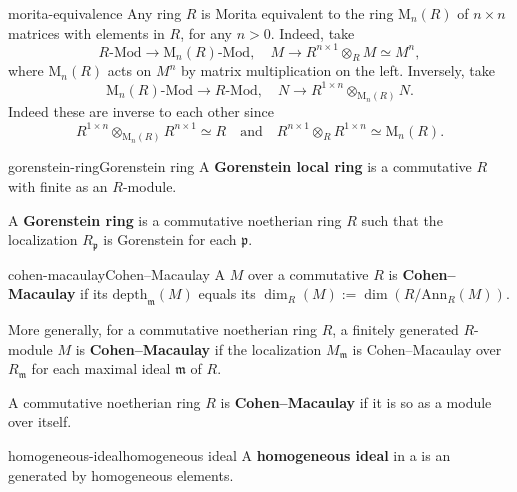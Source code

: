 \begin{example}{morita-equivalence}
    Any ring $R$ is Morita equivalent to the ring $\text{M}_n(R)$ of $n \times n$ matrices with elements in $R$, for any $n > 0$. Indeed, take
    \[ R\text{-Mod} \to \text{M}_n(R)\text{-Mod}, \quad M \to R^{n \times 1} \otimes_R M \simeq M^n , \]
    where $\text{M}_n(R)$ acts on $M^n$ by matrix multiplication on the left. Inversely, take
    \[ \text{M}_n(R)\text{-Mod} \to R\text{-Mod}, \quad N \to R^{1 \times n} \otimes_{\text{M}_n(R)} N . \]
    Indeed these are inverse to each other since
    \[ R^{1 \times n} \otimes_{\text{M}_n(R)} R^{n \times 1} \simeq R \quad \text{and} \quad R^{n \times 1} \otimes_R R^{1 \times n} \simeq \text{M}_n(R) . \]
\end{example}

\begin{topic}{gorenstein-ring}{Gorenstein ring}
    A \textbf{Gorenstein local ring} is a commutative    $R$ with finite  as an $R$-module.
    
    A \textbf{Gorenstein ring} is a commutative noetherian ring $R$ such that the localization $R_\mathfrak{p}$ is Gorenstein for each  $\mathfrak{p}$.
\end{topic}

\begin{topic}{cohen-macaulay}{Cohen--Macaulay}
    A   $M$ over a commutative    $R$ is \textbf{Cohen--Macaulay} if its  $\text{depth}_{\mathfrak{m}}(M)$ equals its  $\dim_R(M) := \dim(R/\text{Ann}_R(M))$.
    
    More generally, for a commutative noetherian ring $R$, a finitely generated $R$-module $M$ is \textbf{Cohen--Macaulay} if the localization $M_\mathfrak{m}$ is Cohen--Macaulay over $R_\mathfrak{m}$ for each maximal ideal $\mathfrak{m}$ of $R$.
    
    A commutative noetherian ring $R$ is \textbf{Cohen--Macaulay} if it is so as a module over itself.
\end{topic}

\begin{topic}{homogeneous-ideal}{homogeneous ideal}
    A \textbf{homogeneous ideal} in a  is an  generated by homogeneous elements.
\end{topic}


